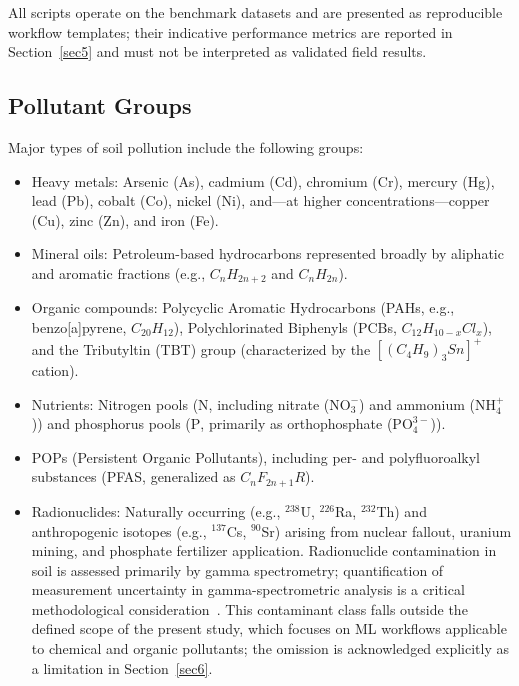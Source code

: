 \documentclass[environremediat,article,accept,pdftex,oneauthor]{Definitions/mdpi}
\begin{document}
All scripts operate on the benchmark datasets and are presented
as reproducible workflow templates; their indicative performance
metrics are reported in Section~\ref{sec5} and must not be interpreted
as validated field results.

\subsection{Pollutant Groups}\label{sec2.1}

Major types of soil pollution include the following groups:

\begin{itemize}
    \item Heavy metals: %
 Arsenic (As), %
 cadmium (Cd), chromium (Cr),
        mercury (Hg), lead (Pb), cobalt (Co), nickel (Ni), and---at higher
        concentrations---copper (Cu), zinc (Zn), and iron (Fe). %
    \item Mineral oils: Petroleum-based hydrocarbons represented broadly
        by aliphatic and aromatic fractions (e.g., $C_nH_{2n+2}$ and $C_nH_{2n}$).
    \item Organic compounds: Polycyclic Aromatic Hydrocarbons (PAHs,
        e.g., benzo[a]pyrene, $C_{20}H_{12}$), Polychlorinated Biphenyls
        (PCBs, $C_{12}H_{10-x}Cl_x$), and the Tributyltin (TBT) group
        (characterized by the $[(C_4H_9)_3Sn]^+$ cation).
    \item Nutrients: {Nitrogen pools ($\mathrm{N}$, including nitrate ($\mathrm{NO_3^-}$) and ammonium ($\mathrm{NH_4^+}$)) and phosphorus pools ($\mathrm{P}$, primarily as orthophosphate ($\mathrm{PO_4^{3-}}$)).}
    \item POPs (Persistent Organic Pollutants), including per- and
        polyfluoroalkyl substances (PFAS, generalized as $C_nF_{2n+1}R$).
    \item {Radionuclides: Naturally occurring (e.g., $^{238}$U, $^{226}$Ra, $^{232}$Th) and anthropogenic isotopes (e.g., $^{137}$Cs, $^{90}$Sr) arising from nuclear fallout, uranium mining, and phosphate fertilizer application. Radionuclide contamination in soil is assessed primarily by gamma spectrometry; quantification of measurement uncertainty in gamma-spectrometric analysis is a critical methodological consideration~\cite{Dragovi2005}. This contaminant class falls outside the defined scope of the present study, which focuses on ML workflows applicable to chemical and organic pollutants; the omission is acknowledged explicitly as a limitation in Section~\ref{sec6}.}

\end{itemize}
\end{document}
